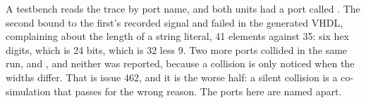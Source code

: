A testbench reads the trace by port name, and both units had a port
called . The second bound to the first's recorded signal
and failed in the generated VHDL, complaining about the length of a
string literal, 41 elements against 35: six hex digits, which is 24
bits, which is 32 less 9. Two more ports collided in the same run,
 and , and neither was reported, because a
collision is only noticed when the widths differ. That is issue 462,
and it is the worse half: a silent collision is a co-simulation that
passes for the wrong reason. The ports here are named apart.


